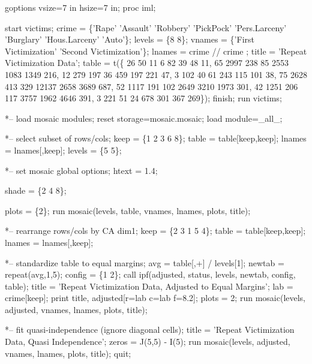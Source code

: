 \begin{listing}
goptions vsize=7 in hsize=7 in;
proc iml;
 
start victims;
   crime = \{'Rape' 'Assault' 'Robbery' 'PickPock' 'Pers.Larceny'
            'Burglary' 'Hous.Larceny' 'Auto'\};
   levels = \{8 8\};
   vnames = \{'First Victimization' 'Second Victimization'\};
   lnames = crime // crime ;
   title  = 'Repeat Victimization Data';
   table = t(\{ 26   50  11   6    82   39   48   11,
              65 2997 238  85  2553 1083 1349  216,
              12  279 197  36   459  197  221   47,
               3  102  40  61   243  115  101   38,
              75 2628 413 329 12137 2658 3689  687,
              52 1117 191 102  2649 3210 1973  301,
              42 1251 206 117  3757 1962 4646  391,
               3  221  51  24   678  301  367  269\});
   finish;
   run victims;

   *-- load mosaic modules;
   reset storage=mosaic.mosaic;
   load module=_all_;
 
   *-- select subset of rows/cols;
   keep = \{1 2 3 6 8\};
   table = table[keep,keep];
   lnames = lnames[,keep];
   levels = \{5 5\};

   *-- set mosaic global options;
   htext = 1.4;
   
   shade = \{2 4 8\};

   plots = \{2\};
   run mosaic(levels, table, vnames, lnames, plots, title);
 
   *-- rearrange rows/cols by CA dim1;
   keep = \{2 3 1 5 4\};
   table = table[keep,keep];
   lnames = lnames[,keep];
 
   *-- standardize table to equal margins;
   avg = table[,+] / levels[1];
   newtab = repeat(avg,1,5);
   config = \{1 2\};
   call ipf(adjusted, status, levels, newtab, config, table);
   title  = 'Repeat Victimization Data, Adjusted to Equal Margins';
   lab = crime[keep];
   print title, adjusted[r=lab c=lab f=8.2];
   plots = 2;
   run mosaic(levels, adjusted, vnames, lnames, plots, title);

   *-- fit quasi-independence (ignore diagonal cells);
   title  = 'Repeat Victimization Data, Quasi Independence';
   zeros = J(5,5) - I(5);
   run mosaic(levels, adjusted, vnames, lnames, plots, title);
quit;
\end{listing}
